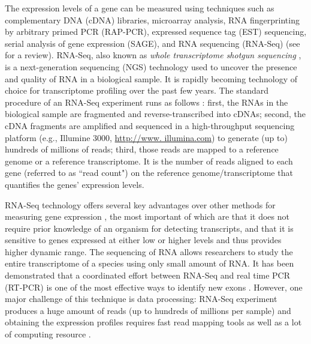 The  expression levels of a gene can be measured using techniques such as
complementary DNA (cDNA) libraries, microarray analysis, RNA fingerprinting by arbitrary primed PCR
(RAP-PCR), expressed sequence tag (EST) sequencing, serial analysis of gene expression (SAGE), and
RNA sequencing (RNA-Seq) (see \cite{casassola2013gene} for a review).
RNA-Seq, also known as \textit{whole transcriptome shotgun sequencing}
\citep{morin2008profiling}, is a next-generation sequencing (NGS) technology used to uncover the
presence and quality of RNA in a biological sample.  It is rapidly becoming technology of choice
for transcriptome profiling over the past few years. 
The standard procedure of an RNA-Seq experiment runs as follows 
\citep{finotello2015measuring}: first, the RNAs in the biological sample are fragmented and
reverse-transcribed into cDNAs; second, the cDNA fragments are amplified and sequenced in a
high-throughput sequencing platform (e.g., Illumine 3000, \url{http://www. illumina.com}) to
generate (up to) hundreds of millions of reads; third, those reads are mapped to a reference
genome
or a reference transcriptome.
It is the number of reads aligned to each gene (referred to as ``read count") on the reference
genome/transcriptome that quantifies the genes' expression levels.  


RNA-Seq technology offers several key advantages over other methods for measuring gene expression 
\citep{wang2009rna}, the most
important of which are that it does not require prior knowledge of an organism for detecting
transcripts,  and that it is sensitive to genes expressed at either low or higher levels and thus
provides higher dynamic range. The sequencing of RNA allows researchers to study the entire
transcriptome of a species using only small amount of RNA. It has been demonstrated that a
coordinated effort between RNA-Seq and real time PCR (RT-PCR) is one of the most effective ways to
identify new exons \citep{howald2012combining}. However, one major challenge of this technique is
data processing: RNA-Seq experiment produces a huge amount of reads (up to hundreds of
millions per sample) and obtaining the expression profiles requires fast read mapping tools as well
as a lot of computing resource \citep{langmead2009ultrafast,li2010fast}.



